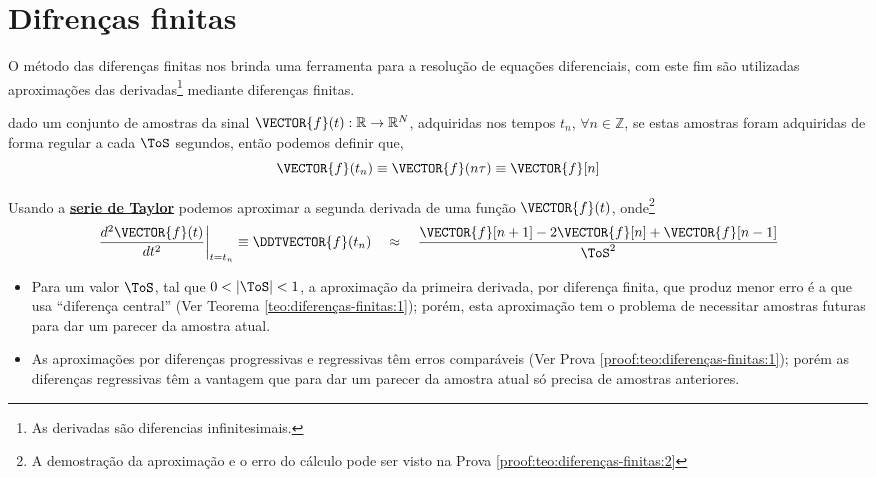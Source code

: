 \section{Difrenças finitas}

O método das diferenças finitas nos brinda uma ferramenta para a resolução de 
equações diferenciais, com este fim são utilizadas aproximações das derivadas\footnote{As 
derivadas são diferencias infinitesimais.} 
mediante diferenças finitas.

\begin{definition}
\label{def:diferenças-finitas:0}
dado um conjunto de amostras da sinal $\VECTOR{f}(t): \mathbb{R} \rightarrow \mathbb{R}^N$, 
adquiridas nos  tempos $t_n$, $\forall n \in \mathbb{Z}$, 
se estas amostras foram adquiridas de forma regular a cada $\ToS$ segundos,
então podemos definir que,
\begin{equation}
\VECTOR{f}(t_n)\equiv \VECTOR{f}(n\tau) \equiv \VECTOR{f}[n]
\end{equation}
\end{definition}

\begin{theorem}
\label{teo:diferenças-finitas:2}
Usando a \hyperref[def:taylor]{\textbf{serie de Taylor}} podemos aproximar 
a segunda derivada de uma função $\VECTOR{f}(t)$, onde\footnote{A
demostração da aproximação e o erro do cálculo pode ser visto na Prova \ref{proof:teo:diferenças-finitas:2}}
\begin{equation}
\left.\frac{d^2\VECTOR{f}(t)}{dt^2}\right|_{t=t_n}\equiv \DDTVECTOR{f}(t_n)
\quad \approx \quad
\frac{\VECTOR{f}[n+1]-2\VECTOR{f}[n]+\VECTOR{f}[n-1]}{\ToS^2}  
\end{equation}
\end{theorem}

\begin{tcbattention}
\begin{itemize}
\item Para um valor $\ToS$, tal que $0<|\ToS|<1$, a aproximação da primeira derivada, por diferença finita, 
que produz menor erro é a que usa ``diferença central'' (Ver Teorema \ref{teo:diferenças-finitas:1}); porém, 
esta aproximação tem o problema de necessitar amostras futuras para dar um parecer da amostra atual.
\item As aproximações por diferenças progressivas e regressivas têm erros comparáveis
 (Ver Prova \ref{proof:teo:diferenças-finitas:1});
porém as diferenças regressivas têm a vantagem que para dar um parecer da amostra atual só precisa de amostras anteriores.
\end{itemize}
\end{tcbattention}


